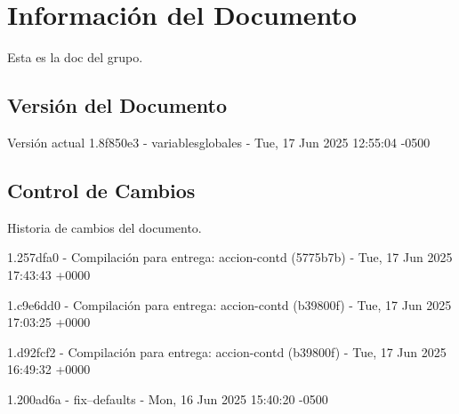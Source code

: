 \documentclass[
	a4paper, %
	12pt, %
]{include/CSSullivanBusinessReport}
\begin{document}
\newpage

\begin{twothirdswidth} %
	\tableofcontents %
\end{twothirdswidth}

\newpage


\newpage

\section{Información del
Documento}\label{sec:informaciuxf3n-del-documento}

Esta es la doc del grupo.

\subsection{Versión del Documento}\label{sec:versiuxf3n-del-documento}

\begin{quote}
\end{quote}

Versión actual 1.8f850e3 - variablesglobales - Tue, 17 Jun 2025 12:55:04
-0500

\subsection{Control de Cambios}\label{sec:control-de-cambios}

Historia de cambios del documento.

1.257dfa0 - Compilación para entrega: accion-contd (5775b7b) - Tue, 17
Jun 2025 17:43:43 +0000

1.c9e6dd0 - Compilación para entrega: accion-contd (b39800f) - Tue, 17
Jun 2025 17:03:25 +0000

1.d92fcf2 - Compilación para entrega: accion-contd (b39800f) - Tue, 17
Jun 2025 16:49:32 +0000

1.200ad6a - fix--defaults - Mon, 16 Jun 2025 15:40:20 -0500
\end{document}
